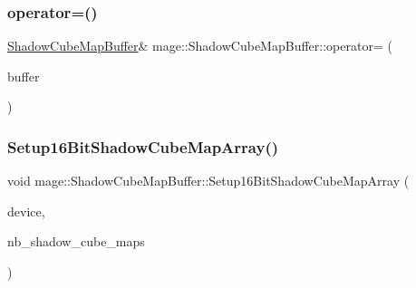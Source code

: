 \hypertarget{structmage_1_1_shadow_cube_map_buffer_aebf8e9d2e0a2ec5bf13dc40b93f97fde}{}\label{structmage_1_1_shadow_cube_map_buffer_aebf8e9d2e0a2ec5bf13dc40b93f97fde} 
\subsubsection{\texorpdfstring{operator=()}{operator=()}\hspace{0.1cm}{\footnotesize\ttfamily [2/2]}}
{\footnotesize\ttfamily \hyperlink{structmage_1_1_shadow_cube_map_buffer}{Shadow\+Cube\+Map\+Buffer}\& mage\+::\+Shadow\+Cube\+Map\+Buffer\+::operator= (\begin{DoxyParamCaption}\item[{\hyperlink{structmage_1_1_shadow_cube_map_buffer}{Shadow\+Cube\+Map\+Buffer} \&\&}]{buffer }\end{DoxyParamCaption})\hspace{0.3cm}{\ttfamily [delete]}}

\hypertarget{structmage_1_1_shadow_cube_map_buffer_a9b9f6219dd2d3fac58e9930d5c4aed89}{}\label{structmage_1_1_shadow_cube_map_buffer_a9b9f6219dd2d3fac58e9930d5c4aed89} 
\subsubsection{\texorpdfstring{Setup16\+Bit\+Shadow\+Cube\+Map\+Array()}{Setup16BitShadowCubeMapArray()}}
{\footnotesize\ttfamily void mage\+::\+Shadow\+Cube\+Map\+Buffer\+::\+Setup16\+Bit\+Shadow\+Cube\+Map\+Array (\begin{DoxyParamCaption}\item[{I\+D3\+D11\+Device2 $\ast$}]{device,  }\item[{size\+\_\+t}]{nb\+\_\+shadow\+\_\+cube\+\_\+maps }\end{DoxyParamCaption})\hspace{0.3cm}{\ttfamily [private]}}

\hypertarget{structmage_1_1_shadow_cube_map_buffer_ab1c660841a9dc2db1fcd3aba6456b400}{}\label{structmage_1_1_shadow_cube_map_buffer_ab1c660841a9dc2db1fcd3aba6456b400} 
